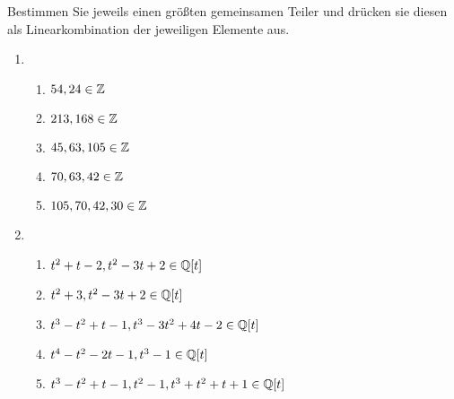 \begin{question}[subtitle = Größte gemeinsame Teiler]
  Bestimmen Sie jeweils einen größten gemeinsamen Teiler und drücken sie diesen als Linearkombination der jeweiligen Elemente aus.
  \begin{enumerate}
    \item
      \begin{enumerate}
        \item
          $54, 24 \in \mathbb{Z}$
        \item
          $213, 168 \in \mathbb{Z}$
        \item
          $45, 63, 105 \in \mathbb{Z}$
        \item
          $70, 63, 42 \in \mathbb{Z}$
        \item
          $105, 70, 42, 30 \in \mathbb{Z}$
      \end{enumerate}
    \item
      \begin{enumerate}
        \item
          $t^2 + t - 2, t^2 - 3 t + 2 \in \mathbb{Q}[t]$
        \item
          $t^2 + 3, t^2 - 3 t + 2 \in \mathbb{Q}[t]$
        \item
          $t^3 - t^2 + t - 1, t^3 - 3 t^2 + 4 t - 2 \in \mathbb{Q}[t]$
        \item
          $t^4 - t^2 - 2 t - 1, t^3 - 1 \in \mathbb{Q}[t]$
        \item
          $t^3 - t^2 + t - 1, t^2 - 1, t^3 + t^2 + t + 1 \in \mathbb{Q}[t]$
      \end{enumerate}
  \end{enumerate}
\end{question}




